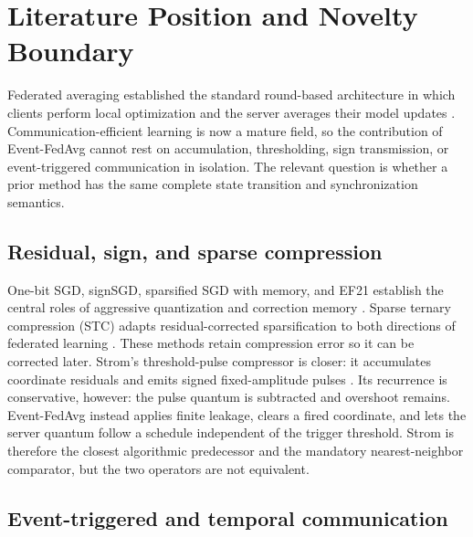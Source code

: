 \section{Literature Position and Novelty Boundary}
\label{sec:literature}

Federated averaging established the standard round-based architecture in which
clients perform local optimization and the server averages their model updates
\citep{mcmahan2017fedavg}. Communication-efficient learning is now a mature
field, so the contribution of Event-FedAvg cannot rest on accumulation,
thresholding, sign transmission, or event-triggered communication in isolation.
The relevant question is whether a prior method has the same complete state
transition and synchronization semantics.

\subsection{Residual, sign, and sparse compression}

One-bit SGD, signSGD, sparsified SGD with memory, and EF21 establish the central
roles of aggressive quantization and correction memory
\citep{seide2014onebit,bernstein2018signsgd,stich2018memory,richtarik2021ef21}.
Sparse ternary compression (STC) adapts residual-corrected sparsification to
both directions of federated learning \citep{sattler2019stc}. These methods
retain compression error so it can be corrected later. Strom's threshold-pulse
compressor is closer: it accumulates coordinate residuals and emits signed
fixed-amplitude pulses \citep{strom2015distributed}. Its recurrence is
conservative, however: the pulse quantum is subtracted and overshoot remains.
Event-FedAvg instead applies finite leakage, clears a fired coordinate, and
lets the server quantum follow a schedule independent of the trigger
threshold. Strom is therefore the closest algorithmic predecessor and the
mandatory nearest-neighbor comparator, but the two operators are not
equivalent.

\subsection{Event-triggered and temporal communication}

